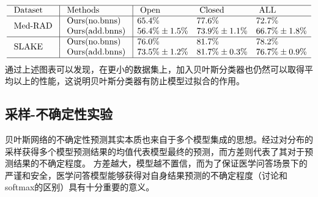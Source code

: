 %
$$
\begin{array}{l|l|lll}
\hline \text { Dataset } & \text { Methods } & \text { Open } & \text { Closed } & \text { ALL } \\
\hline \multirow{2}{*}{\text { Med-RAD }} & \text { Ours(no.bnns) } & 65.4 \% & 77.6 \% & 72.7 \% \\
& \text { Ours(add.bnns) } & 56.4 \% \pm 1.5 \% & 73.9 \% \pm 1.1 \% & 66.7 \% \pm 1.8 \% \\
\hline \multirow{2}{*}{\text { SLAKE }} & \text { Ours(no.bnns) } & 76.0 \% & 81.7 \% & 78.2 \% \\
& \text { Ours(add.bnns) } & 73.5 \% \pm 1.2 \% & 81.7 \% \pm 0.3 \% & 76.7 \% \pm 0.9 \% \\
\hline
\end{array}
$$
通过上述图表可以发现，在更小的数据集上，加入贝叶斯分类器也仍然可以取得平均以上的性能，这说明贝叶斯分类器有防止模型过拟合的作用。


\subsection{采样-不确定性实验}
贝叶斯网络的不确定性预测其实本质也来自于多个模型集成的思想。经过对分布的采样获得多个模型预测结果的均值代表模型最终的预测，而方差则代表了其对于预测结果的不确定程度。
方差越大，模型越不置信，而为了保证医学问答场景下的严谨和安全，医学问答模型能够获得对自身结果预测的不确定程度（讨论和softmax的区别）具有十分重要的意义。

